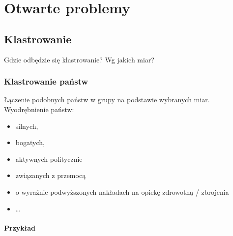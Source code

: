 \documentclass[11pt]{report}
\begin{document}
    \section{Otwarte problemy}

    \subsection{Klastrowanie}
    Gdzie odbędzie się klastrowanie?
    Wg jakich miar?

    \subsubsection{Klastrowanie państw}
    Łączenie podobnych państw w grupy na podstawie wybranych miar.
    Wyodrębnienie państw:
    \begin{itemize}
        \item silnych,
        \item bogatych,
        \item aktywnych politycznie
        \item związanych z przemocą
        \item o wyraźnie podwyższonych nakładach na opiekę zdrowotną / zbrojenia
        \item \ldots
    \end{itemize}

    \paragraph{Przykład}
\end{document}
